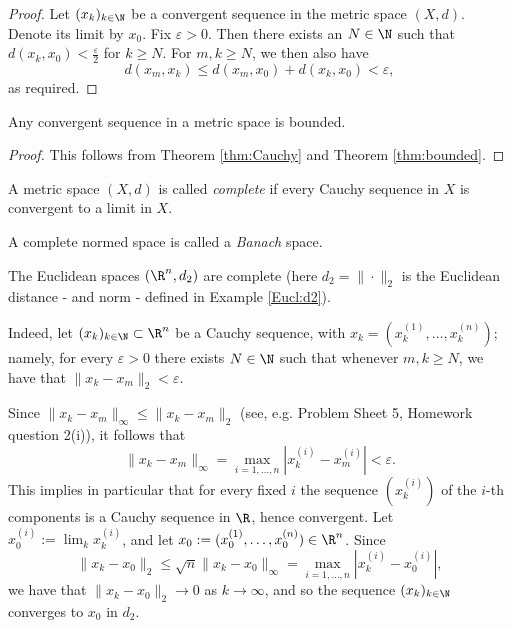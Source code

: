 \begin{proof}
Let $(x_k)_{k \in \N}$ be a convergent sequence in the metric space $(X,d)$.
Denote its limit by $x_0$. Fix $\varepsilon > 0$. Then there exists an $N \in \N$
such that $d(x_k,x_0) < \frac{\varepsilon}{2}$ for $k \ge N$. For $m,k \ge N$,
we then also have
\[
d(x_m,x_k) \le d(x_m,x_0) + d(x_k,x_0) < \varepsilon,
\]
as required.
\end{proof}

\begin{corollary}
Any convergent sequence in a metric space is bounded.
\end{corollary}

\begin{proof}
This follows from Theorem \ref{thm:Cauchy} and Theorem \ref{thm:bounded}.
\end{proof}

\begin{definition}
A metric space $(X,d)$ is called \emph{complete} if every Cauchy sequence in $X$ is
convergent to a limit in $X$.

A complete normed space is called a \emph{Banach} space.
\end{definition}

\np

\begin{example}
The Euclidean spaces $(\R^n, d_2)$ are complete (here $d_2 = \|\cdot \|_2$ is the Euclidean distance - and norm - defined in Example \ref{Eucl:d2}). 

Indeed, let $(x_k)_{k \in \N} \subset \R^n$ be a Cauchy sequence, with $x_k=(x_k^{(1)},\dots,x_k^{(n)})$; namely, for every $\varepsilon>0$ 
there exists $N\in \N$ such that whenever $m,k\geq N$, we have that $\|x_k -x_m\|_2<\varepsilon$.

Since $\|x_k -x_m\|_\infty \leq \|x_k -x_m\|_2$ (see, e.g. Problem Sheet 5, Homework question 2(i)), it follows that  
$$
\|x_k -x_m\|_\infty = \max_{i=1,\dots,n} |x_k^{(i)}-x_m^{(i)}| < \varepsilon.
$$
This implies in particular that for every fixed $i$ the sequence $(x_k^{(i)})$ of the $i$-th components is a Cauchy sequence in $\R$, hence convergent. 
Let $x_0^{(i)}:= \lim_k x_k^{(i)}$, and let $x_0:=(x_0^{(1)},\dots,x_0^{(n)})\in \R^n$. Since 
$$
\|x_k - x_0\|_2 \leq \sqrt n \|x_k -x_0\|_\infty = \max_{i=1,\dots,n} |x_k^{(i)}-x_0^{(i)}|,
$$
we have that $\|x_k - x_0\|_2 \to 0$ as $k\to \infty$, and so the sequence $(x_k)_{k \in \N}$ converges to $x_0$ in $d_2$.
\end{example}

